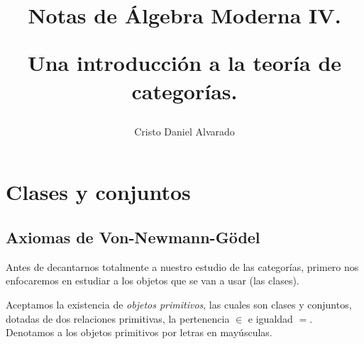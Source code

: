 \documentclass[12pt]{report}
\theoremstyle{largebreak}
\begin{document}
    \title{Notas de Álgebra Moderna IV.
    
    Una introducción a la teoría de categorías.}
    \author{Cristo Daniel Alvarado}
    \maketitle

    \tableofcontents %


    \chapter{Clases y conjuntos}

    \section{Axiomas de Von-Newmann-Gödel}

    Antes de decantarnos totalmente a nuestro estudio de las categorías, primero nos enfocaremos en estudiar a los objetos que se van a usar (las clases).

    Aceptamos la existencia de \textit{objetos primitivos}, las cuales son clases y conjuntos, dotadas de dos relaciones primitivas, la pertenencia $\in$ e igualdad $=$. Denotamos a los objetos primitivos por letras en mayúsculas.
\end{document}
